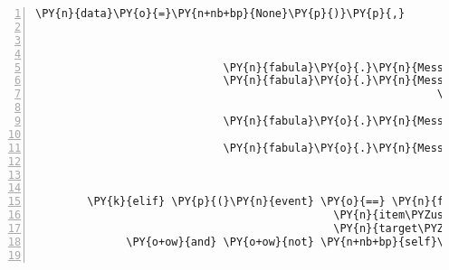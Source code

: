 \begin{Verbatim}[commandchars=\\\{\},numbers=left,firstnumber=1,stepnumber=1]
                                                                                                        \PY{n}{data}\PY{o}{=}\PY{n+nb+bp}{None}\PY{p}{)}\PY{p}{,}
                                                                              \PY{l+s}{\PYZsq{}}\PY{l+s}{text/plain}\PY{l+s}{\PYZsq{}}\PY{p}{:} \PY{n}{fabula}\PY{o}{.}\PY{n}{Asset}\PY{p}{(}\PY{n}{uri}\PY{o}{=}\PY{l+s}{\PYZsq{}}\PY{l+s}{lute.txt}\PY{l+s}{\PYZsq{}}\PY{p}{,}
                                                                                                         \PY{n}{data}\PY{o}{=}\PY{n+nb+bp}{None}\PY{p}{)}\PY{p}{\PYZcb{}}\PY{p}{)}\PY{p}{,}
                                                               \PY{n}{room}\PY{o}{.}\PY{n}{entity\PYZus{}locations}\PY{p}{[}\PY{n}{ID\PYZus{}CASSANDRA}\PY{p}{]} \PY{o}{+} \PY{p}{(}\PY{n}{room}\PY{o}{.}\PY{n}{identifier}\PY{p}{,}\PY{p}{)}\PY{p}{)}\PY{p}{]}\PY{p}{)}\PY{p}{,}
                             \PY{n}{fabula}\PY{o}{.}\PY{n}{Message}\PY{p}{(}\PY{p}{[}\PY{n}{fabula}\PY{o}{.}\PY{n}{DeleteEvent}\PY{p}{(}\PY{n}{identifier}\PY{o}{=}\PY{l+s}{\PYZsq{}}\PY{l+s}{lute\PYZus{}broken}\PY{l+s}{\PYZsq{}}\PY{p}{)}\PY{p}{]}\PY{p}{)}\PY{p}{,}
                             \PY{n}{fabula}\PY{o}{.}\PY{n}{Message}\PY{p}{(}\PY{p}{[}\PY{n}{fabula}\PY{o}{.}\PY{n}{SaysEvent}\PY{p}{(}\PY{n}{identifier}\PY{o}{=}\PY{n}{ID\PYZus{}CASSANDRA}\PY{p}{,}
                                                              \PY{n}{text}\PY{o}{=}\PY{l+s}{\PYZsq{}}\PY{l+s}{Es hat funktioniert! }\PY{l+s}{\PYZsq{}}
                                                                   \PY{l+s}{\PYZsq{}}\PY{l+s}{Jetzt haben wir eine spielbare Laute.}\PY{l+s}{\PYZsq{}}\PY{p}{)}\PY{p}{]}\PY{p}{)}\PY{p}{,}
                             \PY{n}{fabula}\PY{o}{.}\PY{n}{Message}\PY{p}{(}\PY{p}{[}\PY{n}{fabula}\PY{o}{.}\PY{n}{PicksUpEvent}\PY{p}{(}\PY{n}{identifier}\PY{o}{=}\PY{n}{ID\PYZus{}CASSANDRA}\PY{p}{,}
                                                                 \PY{n}{item\PYZus{}identifier}\PY{o}{=}\PY{l+s}{\PYZsq{}}\PY{l+s}{lute}\PY{l+s}{\PYZsq{}}\PY{p}{)}\PY{p}{]}\PY{p}{)}\PY{p}{,}
                             \PY{n}{fabula}\PY{o}{.}\PY{n}{Message}\PY{p}{(}\PY{p}{[}\PY{n}{fabula}\PY{o}{.}\PY{n}{PerceptionEvent}\PY{p}{(}\PY{n}{identifier}\PY{o}{=}\PY{n}{ID\PYZus{}KUNI}\PY{p}{,}
                                                                    \PY{n}{perception}\PY{o}{=}\PY{l+s}{\PYZsq{}}\PY{l+s}{Cassandra hat die Laute eingesteckt.}\PY{l+s}{\PYZsq{}}\PY{p}{)}\PY{p}{]}\PY{p}{)}\PY{p}{]}


        \PY{k}{elif} \PY{p}{(}\PY{n}{event} \PY{o}{==} \PY{n}{fabula}\PY{o}{.}\PY{n}{TriesToDropEvent}\PY{p}{(}\PY{n}{identifier}\PY{o}{=}\PY{n}{ID\PYZus{}CASSANDRA}\PY{p}{,}
                                              \PY{n}{item\PYZus{}identifier}\PY{o}{=}\PY{l+s}{\PYZsq{}}\PY{l+s}{lute\PYZus{}broken}\PY{l+s}{\PYZsq{}}\PY{p}{,}
                                              \PY{n}{target\PYZus{}identifier}\PY{o}{=}\PY{n}{ID\PYZus{}KUNI}\PY{p}{)}
              \PY{o+ow}{and} \PY{o+ow}{not} \PY{n+nb+bp}{self}\PY{o}{.}\PY{n}{lute\PYZus{}is\PYZus{}repaired}\PY{p}{)}\PY{p}{:}


\end{Verbatim}
